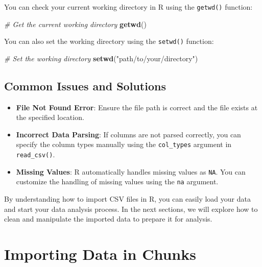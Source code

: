 \documentclass[
]{book}
\newenvironment{Shaded}{\begin{snugshade}}{\end{snugshade}}
\newcommand{\CommentTok}[1]{\textcolor[rgb]{0.56,0.35,0.01}{\textit{#1}}}
\newcommand{\FunctionTok}[1]{\textcolor[rgb]{0.13,0.29,0.53}{\textbf{#1}}}
\newcommand{\NormalTok}[1]{#1}
\newcommand{\StringTok}[1]{\textcolor[rgb]{0.31,0.60,0.02}{#1}}
\providecommand{\tightlist}{%
  \setlength{\itemsep}{0pt}\setlength{\parskip}{0pt}}
\begin{document}
You can check your current working directory in R using the \texttt{getwd()} function:

\begin{Shaded}
\begin{Highlighting}[]
\CommentTok{\# Get the current working directory}
\FunctionTok{getwd}\NormalTok{()}
\end{Highlighting}
\end{Shaded}

You can also set the working directory using the \texttt{setwd()} function:

\begin{Shaded}
\begin{Highlighting}[]
\CommentTok{\# Set the working directory}
\FunctionTok{setwd}\NormalTok{(}\StringTok{"path/to/your/directory"}\NormalTok{)}
\end{Highlighting}
\end{Shaded}

\hypertarget{common-issues-and-solutions}{%
\subsection{Common Issues and Solutions}\label{common-issues-and-solutions}}

\begin{itemize}
\tightlist
\item
  \textbf{File Not Found Error}: Ensure the file path is correct and the file exists at the specified location.
\item
  \textbf{Incorrect Data Parsing}: If columns are not parsed correctly, you can specify the column types manually using the \texttt{col\_types} argument in \texttt{read\_csv()}.
\item
  \textbf{Missing Values}: R automatically handles missing values as \texttt{NA}. You can customize the handling of missing values using the \texttt{na} argument.
\end{itemize}

By understanding how to import CSV files in R, you can easily load your data and start your data analysis process. In the next sections, we will explore how to clean and manipulate the imported data to prepare it for analysis.

\hypertarget{importing-data-in-chunks}{%
\section{Importing Data in Chunks}\label{importing-data-in-chunks}}
\end{document}
